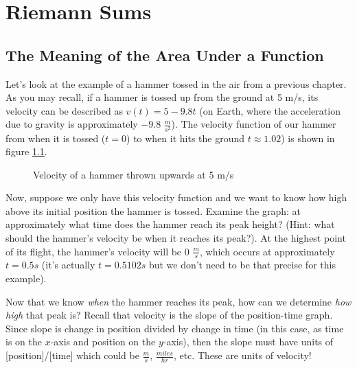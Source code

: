 	\chapter{Riemann Sums}

\section{The Meaning of the Area Under a Function}

Let's look at the example of a hammer tossed in the air from a previous chapter. As you may recall, if a hammer is tossed up from the ground at 5 m/s, its velocity can be described as $v(t) = 5-9.8t$ (on Earth, where the acceleration due to gravity is approximately $-9.8$ $\frac{m}{s^2}$). The velocity function of our hammer from when it is tossed ($t=0$) to when it hits the ground $t\approx1.02$) is shown in figure \ref{fig:hammer}.

\begin{figure}[htbp]
	\centering
	\caption{Velocity of a hammer thrown upwards at 5 m/s}
	\label{fig:hammer}
\end{figure}

Now, suppose we only have this velocity function and we want to know how high above its initial position the hammer is tossed. Examine the graph: at approximately what time does the hammer reach its peak height? (Hint: what should the hammer's velocity be when it reaches its peak?). At the highest point of its flight, the hammer's velocity will be $0$ $\frac{m}{s}$, which occurs at approximately $t=0.5s$ (it's actually $t=0.5102s$ but we don't need to be that precise for this example). 

Now that we know \textit{when} the hammer reaches its peak, how can we determine \textit{how high} that peak is? Recall that velocity is the slope of the position-time graph. Since slope is change in position divided by change in time (in this case, as time is on the $x$-axis and position on the $y$-axis), then the slope must have units of [position]/[time] which could be $\frac{m}{s}$, $\frac{miles}{hr}$, etc. These are units of velocity! 

